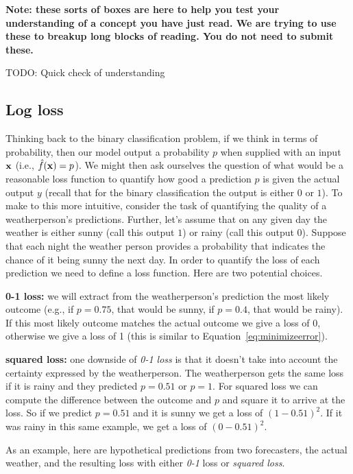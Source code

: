 \documentclass[assignment03_Solutions]{subfiles}
\begin{document}
\begin{understandingcheck}
\textbf{Note: these sorts of boxes are here to help you test your understanding of a concept you have just read.  We are trying to use these to breakup long blocks of reading.  You do not need to submit these.}

TODO: Quick check of understanding
\end{understandingcheck}

\subsection{Log loss}
Thinking back to the binary classification problem, if we think in terms of probability, then our model output a probability $p$ when supplied with an input $\mathbf{x}$ (i.e., $\hat{f}(\mathbf{x}) = p$).  We might then ask ourselves the question of what would be a reasonable loss function to quantify how good a prediction $p$ is given the actual output $y$ (recall that for the binary classification the output is either $0$ or $1$).  To make to this more intuitive, consider the task of quantifying the quality of a weatherperson's predictions.  Further, let's assume that on any given day the weather is either sunny (call this output $1$) or rainy (call this output $0$).  Suppose that each night the weather person provides a probability that indicates the chance of it being sunny the next day.  In order to quantify the loss of each prediction we need to define a loss function.  Here are two potential choices.
\be
\item \textbf{0-1 loss:} we will extract from the weatherperson's prediction the most likely outcome (e.g., if $p = 0.75$, that would be sunny, if $p = 0.4$, that would be rainy).  If this most likely outcome matches the actual outcome we give a loss of 0, otherwise we give a loss of 1 (this is similar to Equation~\ref{eq:minimizeerror}).
\item \textbf{squared loss:} one downside of \emph{0-1 loss} is that it doesn't take into account the certainty expressed by the weatherperson.  The weatherperson gets the same loss if it is rainy and they predicted $p = 0.51$ or $p = 1$.  For squared loss we can compute the difference between the outcome and $p$ and square it to arrive at the loss.  So if we predict $p = 0.51$ and it is sunny we get a loss of $(1 - 0.51)^2$.  If it was rainy in this same example, we get a loss of $(0 - 0.51)^2$.
\ee

As an example, here are hypothetical predictions from two forecasters, the actual weather, and the resulting loss with either \emph{0-1} loss or \emph{squared loss}.
\end{document}

